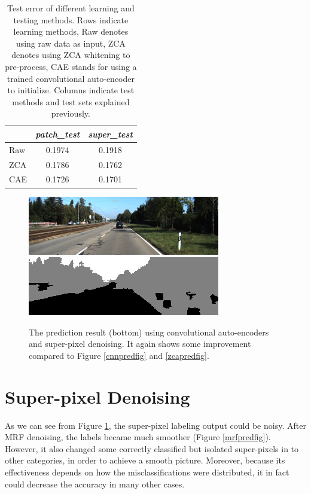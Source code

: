 \begin{table}
	\centering	
	\begin{tabular}{lcc}	
				& \textit{patch\_test} & \textit{super\_test}\\
	\hline
	Raw 			& 0.1974	 & 0.1918\\
	ZCA			& 0.1786	 & 0.1762\\
	CAE			& 0.1726 & 0.1701\\	
	\end{tabular}	
	\caption{Test error of different learning and testing methods.  Rows indicate learning methods, Raw denotes using raw data as input, ZCA denotes using ZCA whitening to pre-process, CAE stands for using a trained convolutional auto-encoder to initialize. Columns indicate test methods and test sets explained previously.}
	\label{supertab}	
\end{table}

\begin{figure}[h!]
\centering
\includegraphics[width=0.7\linewidth]{pics/img.png}
\includegraphics[width=0.7\linewidth]{pics/super.png}
\caption{The prediction result (bottom) using convolutional auto-encoders and super-pixel denoising. It again shows some improvement compared to Figure \ref{cnnpredfig} and \ref{zcapredfig}.}
\label{superpredfig}
\end{figure}

\section{Super-pixel Denoising} 
As we can see from Figure \ref{superpredfig}, the super-pixel labeling output could be noisy. After MRF denoising, the labels became much smoother (Figure \ref{mrfpredfig}). However, it also changed some correctly classified but isolated super-pixels in to other categories, in order to achieve a smooth picture. Moreover, because its effectiveness depends on how the misclassifications were distributed, it in fact could decrease the accuracy in many other cases.

